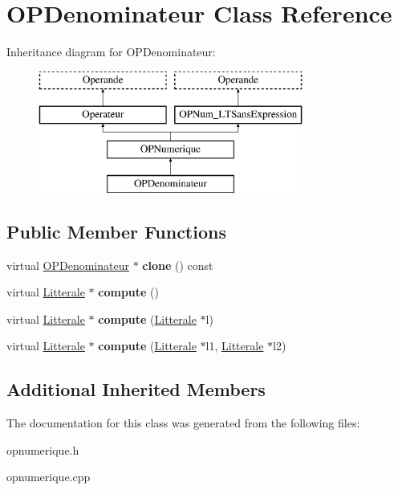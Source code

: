 \hypertarget{class_o_p_denominateur}{}\section{O\+P\+Denominateur Class Reference}
\label{class_o_p_denominateur}
Inheritance diagram for O\+P\+Denominateur\+:\begin{figure}[H]
\begin{center}
\leavevmode
\includegraphics[height=4.000000cm]{class_o_p_denominateur}
\end{center}
\end{figure}
\subsection*{Public Member Functions}
\begin{DoxyCompactItemize}
\item 
virtual \hyperlink{class_o_p_denominateur}{O\+P\+Denominateur} $\ast$ {\bfseries clone} () const \hypertarget{class_o_p_denominateur_a325d837c2c74e246a53615b087130765}{}\label{class_o_p_denominateur_a325d837c2c74e246a53615b087130765}

\item 
virtual \hyperlink{class_litterale}{Litterale} $\ast$ {\bfseries compute} ()\hypertarget{class_o_p_denominateur_a982e8e23e558352486d172d852aa732d}{}\label{class_o_p_denominateur_a982e8e23e558352486d172d852aa732d}

\item 
virtual \hyperlink{class_litterale}{Litterale} $\ast$ {\bfseries compute} (\hyperlink{class_litterale}{Litterale} $\ast$l)\hypertarget{class_o_p_denominateur_af95c5033dd9770a3ec23b72d73fa9e24}{}\label{class_o_p_denominateur_af95c5033dd9770a3ec23b72d73fa9e24}

\item 
virtual \hyperlink{class_litterale}{Litterale} $\ast$ {\bfseries compute} (\hyperlink{class_litterale}{Litterale} $\ast$l1, \hyperlink{class_litterale}{Litterale} $\ast$l2)\hypertarget{class_o_p_denominateur_ad099dbca81442d91c6721c89a7a36a7b}{}\label{class_o_p_denominateur_ad099dbca81442d91c6721c89a7a36a7b}

\end{DoxyCompactItemize}
\subsection*{Additional Inherited Members}


The documentation for this class was generated from the following files\+:\begin{DoxyCompactItemize}
\item 
opnumerique.\+h\item 
opnumerique.\+cpp\end{DoxyCompactItemize}
